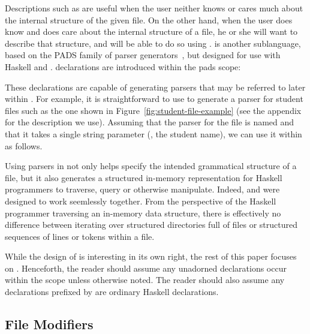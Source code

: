 \documentclass[natbib]{sigplanconf}
\begin{document}
Descriptions such as  are useful when the user neither knows or cares much about
the internal structure of the given file.  On the other hand, when the user does know and does
care about the internal structure of a file, he or she will want to describe that structure,
and will be able to do so using \padshaskell{}.  \padshaskell{} is another sublanguage,
based on the PADS family of parser 
generators~\cite{fisher+:pads,fisher+:popl06,mandelbaum+:pads-ml}, but 
designed for use with Haskell and \forest{}.  \padshaskell{} declarations are introduced
within the pads scope:
\noindent
\begin{code}
\end{code}
These declarations are capable of generating parsers that may be referred
to later within \forest{}.  For example, it is straightforward to use \padshaskell{} to generate
a parser for student files such as the one shown in Figure~\ref{fig:student-file-example}
(see the appendix for the description we use).
Assuming that the parser for the file is named  and that it takes a single string parameter
(, the student name), we can use it within \forest{} as follows.
\begin{code}
[forest| 
  type SFile (n::String) = File (Student n) 
|]
\end{code}
Using \padshaskell{} parsers in \forest{} not only helps specify the intended grammatical structure
of a file, but it also generates a structured in-memory representation for Haskell programmers
to traverse, query or otherwise manipulate.  Indeed, \padshaskell{} and \forest{}
were designed to work seemlessly together.  From the perspective of the Haskell
programmer traversing an in-memory data structure, there is effectively
no difference between iterating over structured directories full of files or
structured sequences of lines or tokens within a file.

While the design of \padshaskell{} is interesting in its own right, the rest of this
paper focuses on \forest{}.  Henceforth, the reader should assume
any unadorned declarations 
occur within the \forest{} scope \cd{[forest| ... |]} unless otherwise noted.
The reader should also assume any declarations prefixed by \cd{>} are ordinary
Haskell declarations.

\subsection{File Modifiers}
\label{sec:file-modifiers}
\end{document}
